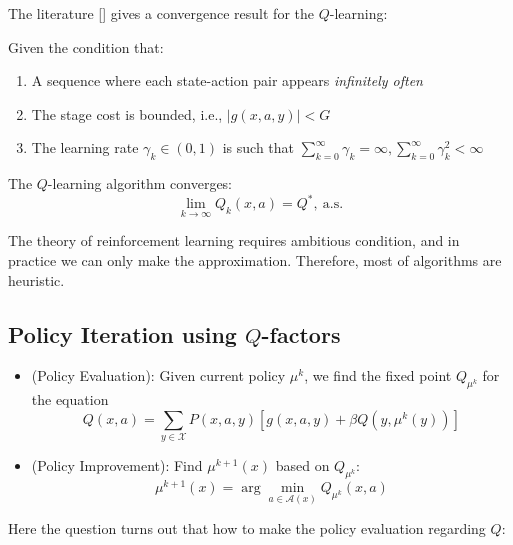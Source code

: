 The literature [\cite{Watkins92}] gives a convergence result for the $Q$-learning:
\begin{theorem}
Given the condition that:
\begin{enumerate}
\item
A sequence where each state-action pair appears \emph{infinitely often}
\item
The stage cost is bounded, i.e., $|g(x,a,y)|<G$
\item
The learning rate $\gamma_k\in(0,1)$ is such that $\sum_{k=0}^\infty\gamma_k=\infty,\sum_{k=0}^\infty \gamma_k^2<\infty$
\end{enumerate}
The $Q$-learning algorithm converges:
\[
\lim_{k\to\infty}Q_k(x,a)=Q^*, \ \text{a.s.}
\]
\end{theorem}
\begin{remark}
The theory of reinforcement learning requires ambitious condition, and in practice we can only make the approximation. Therefore, most of algorithms are heuristic. 
\end{remark}

\subsection{Policy Iteration using $Q$-factors}
\begin{itemize}
\item
(Policy Evaluation):
Given current policy $\mu^k$, we find the fixed point $Q_{\mu^k}$ for the equation
\[
Q(x,a)=\sum_{y\in\mathcal{X}}P(x,a,y)[g(x,a,y)+\beta Q(y,\mu^k(y))]
\]
\item
(Policy Improvement): 
Find $\mu^{k+1}(x)$ based on $Q_{\mu^k}$:
\[
\mu^{k+1}(x)=\arg\min_{a\in\mathcal{A}(x)}Q_{\mu^k}(x,a)
\]
\end{itemize}

Here the question turns out that how to make the policy evaluation regarding $Q$:

